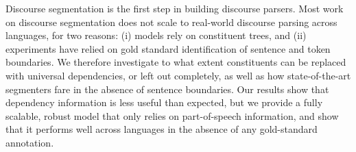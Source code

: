 Discourse segmentation is the first step in building discourse parsers. Most work on discourse segmentation does not scale to real-world discourse parsing across languages, for two reasons: (i) models rely on constituent trees, and (ii) experiments have relied on gold standard identification of sentence and token boundaries. We therefore investigate to what extent constituents can be replaced with universal dependencies, or left out completely, as well as how state-of-the-art segmenters fare in the absence of sentence boundaries. Our results show that dependency information is less useful than expected, but we provide a fully scalable, robust model that only relies on part-of-speech information, and show that it performs well across languages in the absence of any gold-standard annotation.
